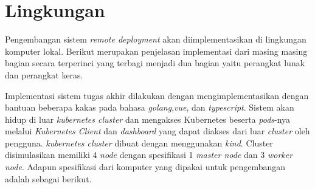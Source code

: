\section{Lingkungan}
\label{sec:lingkungan-implementasi}
Pengembangan sistem \textit{remote deployment} akan diimplementasikan di lingkungan komputer lokal. Berikut merupakan penjelasan implementasi dari masing masing bagian secara terperinci yang terbagi menjadi dua bagian yaitu perangkat lunak dan perangkat keras.

Implementasi sistem tugas akhir dilakukan dengan mengimplementasikan dengan bantuan beberapa kakas pada bahasa \textit{golang},\textit{vue}, dan \textit{typescript}. Sistem akan hidup di luar \textit{kubernetes cluster} dan mengakses Kubernetes beserta \textit{pods}-nya melalui \textit{Kubernetes Client} dan \textit{dashboard} yang dapat diakses dari luar \textit{cluster} oleh pengguna. \textit{kubernetes cluster} dibuat dengan menggunakan \textit{kind}. Cluster disimulasikan memiliki 4 \textit{node} dengan spesifikasi 1 \textit{master node} dan 3 \textit{worker node}. Adapun spesifikasi dari komputer yang dipakai untuk pengembangan adalah sebagai berikut.
